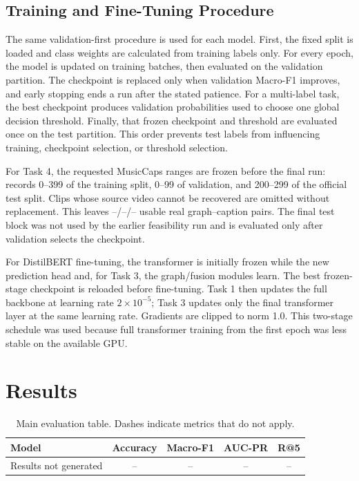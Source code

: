 \documentclass[conference]{IEEEtran}
\newcommand{\TaskFourTrain}{--}
\newcommand{\TaskFourValidation}{--}
\newcommand{\TaskFourTest}{--}
\newcommand{\EvaluationTableRows}{Results not generated & -- & -- & -- & -- \\
  }
\begin{document}
\subsection{Training and Fine-Tuning Procedure}
The same validation-first procedure is used for each model. First, the fixed split is loaded and
class weights are calculated from training labels only. For every epoch, the model is updated on
training batches, then evaluated on the validation partition. The checkpoint is replaced only
when validation Macro-F1 improves, and early stopping ends a run after the stated patience. For a
multi-label task, the best checkpoint produces validation probabilities used to choose one global
decision threshold. Finally, that frozen checkpoint and threshold are evaluated once on the test
partition. This order prevents test labels from influencing training, checkpoint selection, or
threshold selection.

For Task 4, the requested MusicCaps ranges are frozen before the final run: records 0--399 of
the training split, 0--99 of validation, and 200--299 of the official test split. Clips whose
source video cannot be recovered are omitted without replacement. This leaves
\TaskFourTrain{}/\TaskFourValidation{}/\TaskFourTest{} usable real graph--caption pairs. The
final test block was not used by the earlier feasibility run and is evaluated only after
validation selects the checkpoint.

For DistilBERT fine-tuning, the transformer is initially frozen while the new prediction head and,
for Task 3, the graph/fusion modules learn. The best frozen-stage checkpoint is reloaded before
fine-tuning. Task 1 then updates the full backbone at learning rate $2\times10^{-5}$; Task 3 updates
only the final transformer layer at the same learning rate. Gradients are clipped to norm 1.0.
This two-stage schedule was used because full transformer training from the first epoch was less
stable on the available GPU.

\section{Results}
\begin{table}[t]
\centering
\caption{Main evaluation table. Dashes indicate metrics that do not apply.}
\begin{tabular}{lcccc}
\toprule
Model & Accuracy & Macro-F1 & AUC-PR & R@5\\
\midrule
\EvaluationTableRows
\bottomrule
\end{tabular}
\label{tab:main-results}
\end{table}
\end{document}
